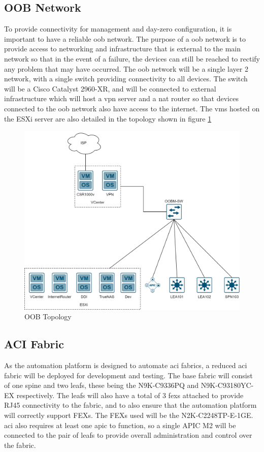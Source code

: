 \subsection{OOB Network}
\label{design:Testbed:network-design:oob}
To provide connectivity for management and day-zero configuration, it is
important to have a reliable \gls{oob} network. The purpose of a \gls{oob}
network is to provide access to networking and infrastructure that is external
to the main network so that in the event of a failure, the devices can still be
reached to rectify any problem that may have occurred. The \gls{oob} network
will be a single layer 2 network, with a single switch providing connectivity
to all devices. The switch will be a Cisco Catalyst 2960-XR, and will be
connected to external infrastructure which will host a \gls{vpn} server and a
\gls{nat} router so that devices connected to the \gls{oob} network also have
access to the internet. The \gls{vm}s hosted on the ESXi server are also
detailed in the topology shown in figure \ref{fig:oob-topology}

\begin{figure}[H]
    \centering

    \includegraphics[scale=0.25]{images/oob-topology.png}
    \caption{OOB
        Topology}
    \label{fig:oob-topology}
\end{figure}

\subsection{ACI Fabric}
\label{design:Testbed:network-design}
As the automation platform is designed to
automate \gls{aci} fabrics, a reduced \gls{aci} fabric will be deployed for
development and testing. The base fabric will consist of one spine and two
leafs, these being the N9K-C9336PQ and N9K-C93180YC-EX respectively. The leafs
will also have a total of 3 \gls{fex}s attached to provide RJ45 connectivity to
the fabric, and to also ensure that the automation platform will correctly
support FEXs. The FEXs used will be the N2K-C2248TP-E-1GE. \gls{aci} also
requires at least one \gls{apic} to function, so a single APIC M2 will be
connected to the pair of leafs to provide overall administration and control
over the fabric.

